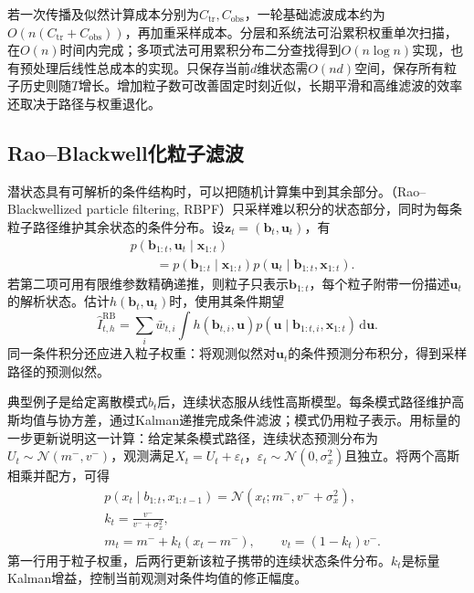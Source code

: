 若一次传播及似然计算成本分别为$C_{\mathrm{tr}},C_{\mathrm{obs}}$，一轮基础滤波成本约为$O(n(C_{\mathrm{tr}}+C_{\mathrm{obs}}))$，再加重采样成本。分层和系统法可沿累积权重单次扫描，在$O(n)$时间内完成；多项式法可用累积分布二分查找得到$O(n\log n)$实现，也有预处理后线性总成本的实现。只保存当前$d$维状态需$O(nd)$空间，保存所有粒子历史则随$T$增长。增加粒子数可改善固定时刻近似，长期平滑和高维滤波的效率还取决于路径与权重退化。

\subsection{Rao--Blackwell化粒子滤波}
\label{sec:pgm-sampling-rbpf}

潜状态具有可解析的条件结构时，可以把随机计算集中到其余部分。（Rao--Blackwellized particle filtering, RBPF）只采样难以积分的状态部分，同时为每条粒子路径维护其余状态的条件分布。设$\bm{z}_t=(\bm{b}_t,\bm{u}_t)$，有
\begin{equation}
  \begin{aligned}
    &p(\bm{b}_{1:t},\bm{u}_t\mid\bm{x}_{1:t})\\
    &\qquad=p(\bm{b}_{1:t}\mid\bm{x}_{1:t})
        p(\bm{u}_t\mid\bm{b}_{1:t},\bm{x}_{1:t}).
  \end{aligned}
  \label{eq:pgm-sampling-rbpf-factor}
\end{equation}
若第二项可用有限维参数精确递推，则粒子只表示$\bm{b}_{1:t}$，每个粒子附带一份描述$\bm{u}_t$的解析状态。估计$h(\bm{b}_t,\bm{u}_t)$时，使用其条件期望
\[
  \widehat I_{t,h}^{\mathrm{RB}}
    =\sum_i\bar w_{t,i}
      \int h(\bm{b}_{t,i},\bm{u})
       p(\bm{u}\mid\bm{b}_{1:t,i},\bm{x}_{1:t})\,\mathrm{d}\bm{u}.
\]
同一条件积分还应进入粒子权重：将观测似然对$\bm{u}_t$的条件预测分布积分，得到采样路径的预测似然。

典型例子是给定离散模式$b_t$后，连续状态服从线性高斯模型。每条模式路径维护高斯均值与协方差，通过Kalman递推完成条件滤波；模式仍用粒子表示。用标量的一步更新说明这一计算：给定某条模式路径，连续状态预测分布为$U_t\sim\mathcal{N}(m^-,v^-)$，观测满足$X_t=U_t+\varepsilon_t$，$\varepsilon_t\sim\mathcal{N}(0,\sigma_x^2)$且独立。将两个高斯相乘并配方，可得
\begin{equation}
  \begin{aligned}
    &p(x_t\mid b_{1:t},x_{1:t-1})
       =\mathcal{N}(x_t;m^-,v^-+\sigma_x^2),\\
    &k_t=\frac{v^-}{v^-+\sigma_x^2},\\
    &m_t=m^-+k_t(x_t-m^-),\qquad v_t=(1-k_t)v^-.
  \end{aligned}
  \label{eq:pgm-sampling-rbpf-gaussian}
\end{equation}
第一行用于粒子权重，后两行更新该粒子携带的连续状态条件分布。$k_t$是标量Kalman增益，控制当前观测对条件均值的修正幅度。

